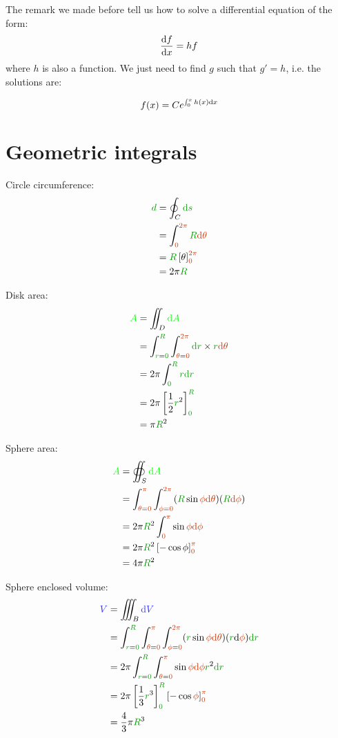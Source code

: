 The remark we made before tell us how to solve a differential equation
of the form:
\[
\frac {\mathrm{d} f} {\mathrm{d} x} = h f
\]
where $h$ is also a function. We just need to find $g$ such that $g' =
h$, i.e. the solutions are:

\[
f(x) = C e^{\int_0^x h(x) \mathrm{d} x}
\]


\section{Geometric integrals}

Circle circumference:
\begin{align*}
\dist{d}
&= \oint_C \dist{\d s}
\\
&= \int_{\angle{0}}^{\angle{2\pi}} \dist{R} \angle{\d \theta}
\\
&= \dist{R} \left[ \theta \right]_{\angle{0}}^{\angle{2\pi}}
\\
&= 2\pi \dist{R}
\\
\end{align*}

Disk area:
\begin{align*}
\area{A}
&= \iint_D \area{\d A}
\\
&= \int_{\dist{r}=\dist{0}}^{\dist{R}}
  \int_{\angle{\theta}=\angle{0}}^{\angle{2\pi}}
  \dist{\d r} \times \dist{r} \angle{\d \theta}
\\
&= 2\pi \int_{\dist{0}}^{\dist{R}} \dist{r} \dist{\d r}
\\
&= 2\pi \left[\frac 1 2 \dist{r}^2\right]_{\dist{0}}^{\dist{R}}
\\
&= \pi \dist{R}^2
\end{align*}

Sphere area:
\begin{align*}
\area{A}
&= \oiint_S \area{\d A}
\\
&= \int_{\angle{\theta}=\angle{0}}^{\angle{\pi}}
  \int_{\angle{\phi}=\angle{0}}^{\angle{2\pi}}
  (\dist{R} \sin \angle{\phi} \angle{\d \theta})
  (\dist{R} \angle{\d \phi})
\\
&= 2\pi \dist{R}^2 \int_{\angle{0}}^{\angle{\pi}} \sin \angle{\phi} \angle{\d \phi}
\\
&= 2\pi \dist{R}^2 \left[ - \cos \phi \right]_{\angle{0}}^{\angle{\pi}}
\\
&= 4\pi \dist{R}^2
\end{align*}

Sphere enclosed volume:
\begin{align*}
\vol{V}
&= \iiint_B \vol{\d V}
\\
&= \int_{\dist{r}=\dist{0}}^{\dist{R}}
  \int_{\angle{\theta}=\angle{0}}^{\angle{\pi}}
  \int_{\angle{\phi}=\angle{0}}^{\angle{2\pi}}
  (\dist{r} \sin \angle{\phi} \angle{\d \theta}) (\dist{r} \d \angle{\phi}) \dist{\d r}
\\
&= 2 \pi
  \int_{\dist{r}=\dist{0}}^{\dist{R}}
  \int_{\angle{\theta}=\angle{0}}^{\angle{\pi}} \sin \angle{\phi} \angle{\d \phi} \dist{r}^2 \dist{\d r}
\\
&= 2 \pi
  \left[\frac 1 3 \dist{r}^3\right]_{\dist{0}}^{\dist{R}}
  \left[- \cos \angle{\phi}\right]_{\angle{0}}^{\angle{\pi}}
\\
&= \frac 4 3 \pi \dist{R}^3
\end{align*}
